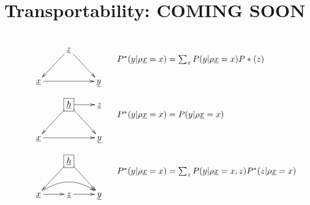 \chapter{Transportability: COMING SOON}

\begin{figure}[h!]
$$
\begin{array}{ll}
\xymatrix{
&\rvz\ar[dl]\ar[dr]
\\
\rvx\ar[rr]&&\rvy
}
&
\begin{array}{l}
\\
\\
P^*(y|\rho \rvx=x)=
\sum_z
P(y|\rho \rvx=x)P*(z)
\end{array}
\\
\xymatrix{
&*+[F]{\rvh}\ar[dl]\ar[dr]\ar[r]
&\rvz
\\
\rvx\ar[rr]&&\rvy
}
&
\begin{array}{l}
\\
\\
P^*(y|\rho \rvx=x)=
P(y|\rho \rvx=x)
\end{array}
\\
\xymatrix{
&*+[F]{\rvh}\ar[dl]\ar[dr]
\\
\rvx\ar[r]\ar@/^1.2pc/[rr]
&\rvz\ar[r]&\rvy
}
&
\begin{array}{l}
\\
\\
P^*(y|\rho \rvx=x)=
\sum_z
P(y|\rho \rvx=x, z)P^*(z|\rho \rvx=x)
\end{array}
\end{array}
$$
\end{figure}


